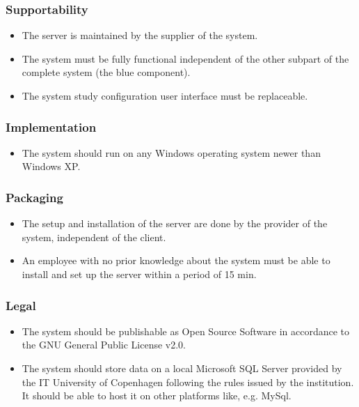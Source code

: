 \subsubsection{Supportability}

\begin{itemize}
	\item The server is maintained by the supplier of the system.
	\item The system must be fully functional independent of the other subpart of the complete system (the blue component).
	\item The system study configuration user interface must be replaceable.
\end{itemize}

\subsubsection{Implementation}

\begin{itemize}
	\item The system should run on any Windows operating system newer than Windows XP.
\end{itemize}

\subsubsection{Packaging}

\begin{itemize}
	\item The setup and installation of the server are done by the provider of the system, independent of the client.
	\item An employee with no prior knowledge about the system must be able to install and set up the server within a period of 15 min.
\end{itemize}

\subsubsection{Legal}

\begin{itemize}
	\item The system should be publishable as Open Source Software in accordance to the GNU General Public License v2.0.
	\item The system should store data on a local Microsoft SQL Server provided by the IT University of Copenhagen following the rules issued by the institution. It should be able to host it on other platforms like, e.g. MySql.
\end{itemize}

